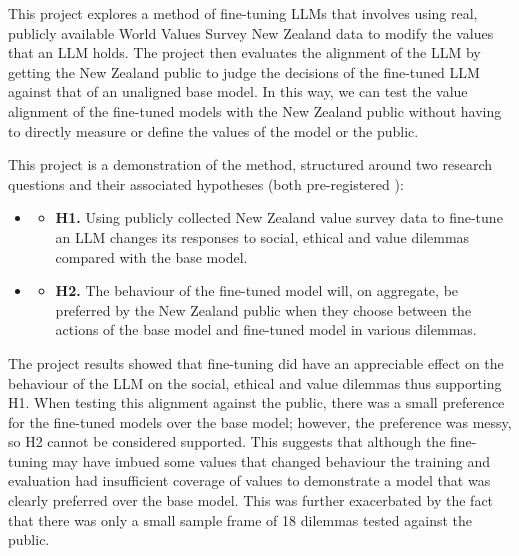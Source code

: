 This project explores a method of fine-tuning LLMs that involves using real, publicly available World Values Survey New Zealand data to modify the values that an LLM holds. The project then evaluates the alignment of the LLM by getting the New Zealand public to judge the decisions of the fine-tuned LLM against that of an unaligned base model. In this way, we can test the value alignment of the fine-tuned models with the New Zealand public without having to directly measure or define the values of the model or the public.


This project is a demonstration of the method, structured around two research questions and their associated hypotheses (both pre-registered \cite{thompsonPreregistrationAligningLLMs2026/10/1515:17}):

\begin{itemize}[label={}, leftmargin=*, itemsep=6pt]
    \item {}
          \begin{itemize}[label={}, leftmargin=1.5em, topsep=2pt, itemsep=0pt]
              \item \textbf{H1.} Using publicly collected New Zealand value survey data to fine-tune an LLM changes its responses to social, ethical and value dilemmas compared with the base model.
          \end{itemize}
    \item {}
          \begin{itemize}[label={}, leftmargin=1.5em, topsep=2pt, itemsep=0pt]
              \item \textbf{H2.} The behaviour of the fine-tuned model will, on aggregate, be preferred by the New Zealand public when they choose between the actions of the base model and fine-tuned model in various dilemmas.
          \end{itemize}
\end{itemize}

The project results showed that fine-tuning did have an appreciable effect on the behaviour of the LLM on the social, ethical and value dilemmas thus supporting H1. When testing this alignment against the public, there was a small preference for the fine-tuned models over the base model; however, the preference was messy, so H2 cannot be considered supported. This suggests that although the fine-tuning may have imbued some values that changed behaviour the training and evaluation had insufficient coverage of values to demonstrate a  model that was clearly preferred over the base model. This was further exacerbated by the fact that there was only a small sample frame of 18 dilemmas tested against the public.

